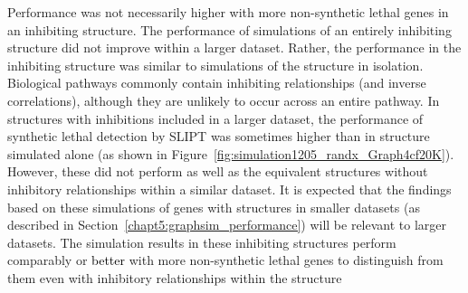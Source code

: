 Performance was not necessarily higher with more non-synthetic lethal genes in an inhibiting  structure. The performance of simulations of an entirely inhibiting  structure did not improve within a larger dataset. Rather, the performance in the inhibiting  structure was similar to simulations of the  structure in isolation. Biological pathways commonly contain inhibiting relationships (and inverse correlations), although they are unlikely to occur across an entire pathway.
%
In  structures with inhibitions included in a larger dataset, the performance of \gls{synthetic lethal} detection by \gls{SLIPT} was sometimes higher than in  structure simulated alone (as shown in Figure~\ref{fig:simulation1205_randx_Graph4cf20K}). %
However, these did not perform as well as the equivalent  structures without inhibitory relationships within a similar dataset.
%
It is expected that the findings based on these simulations of genes with  structures in smaller datasets (as described in Section~\ref{chapt5:graphsim_performance}) will be relevant to larger datasets. The simulation results in these inhibiting  structures  perform comparably or \textcolor{black}{better} with more non-synthetic lethal genes to distinguish from them even with inhibitory relationships within the  structure 



